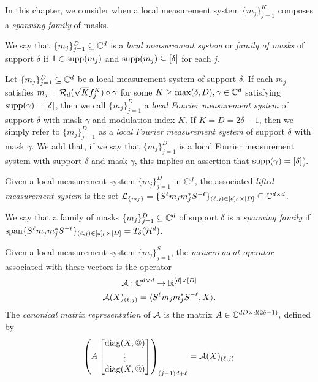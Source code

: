 In this chapter, we consider when a local measurement system $\{m_j\}_{j = 1}^K$ composes a \emph{spanning family} of masks.

\begin{definition}
  We say that $\{m_j\}_{j = 1}^D \subseteq \mathbb{C}^d$ is a \emph{local measurement system} or \emph{family of masks} of support $\delta$ if $1 \in \operatorname{supp}(m_j)$ and $\operatorname{supp}(m_j) \subseteq [\delta]$ for each $j$. \label{def:loc_meas}
\end{definition}

\begin{definition}
  Let $\{m_j\}_{j = 1}^D \subseteq \mathbb{C}^d$ be a local measurement system of support $\delta$.  If each $m_j$ satisfies $m_j = \mathcal{R}_d(\sqrt{K} f_j^K) \circ \gamma$ for some $K \ge \max(\delta, D), \gamma \in \mathbb{C}^d$ satisfying $\operatorname{supp}(\gamma) = [\delta]$, then we call $\{m_j\}_{j = 1}^D$ a \emph{local Fourier measurement system} of support $\delta$ with mask $\gamma$ and modulation index $K$.  If $K = D = 2 \delta - 1$, then we simply refer to $\{m_j\}_{j = 1}^D$ as a \emph{local Fourier measurement system} of support $\delta$ with mask $\gamma$.  We add that, if we say that $\{m_j\}_{j = 1}^D$ is a local Fourier measurement system with support $\delta$ and mask $\gamma$, this implies an assertion that $\operatorname{supp}(\gamma) = [\delta]$). \label{def:loc_four_meas}
\end{definition}

\begin{definition}
  Given a local measurement system $\{m_j\}_{j = 1}^D$ in $\mathbb{C}^d$, the associated \emph{lifted measurement system} is the set $\mathcal{L}_{\{m_j\}} = \{S^{\ell} m_j m_j^* S^{- \ell}\}_{(\ell, j) \in [d]_0 \times [D]} \subseteq \mathbb{C}^{d \times d}$. \label{def:lifted_meas}
\end{definition}

\begin{definition}
  We say that a family of masks $\{m_j\}_{j = 1}^D \subseteq \mathbb{C}^d$ of support $\delta$ is a \emph{spanning family} if $\operatorname{span} \{S^\ell m_j m_j^* S^{-\ell}\}_{(\ell, j) \in [d]_0 \times [D]} = T_\delta(\mathcal{H}^d)$. \label{def:span_fam}
\end{definition}

\begin{definition}
  Given a local measurement system $\{m_j\}_{j = 1}^S$, the \emph{measurement operator} associated with these vectors is the operator
  \begin{gather}
    \mathcal{A} : \mathbb{C}^{d \times d} \to \mathbb{R}^{[d] \times [D]} \nonumber \\
    \mathcal{A}(X)_{(\ell, j)} = \langle S^{\ell} m_j m_j^* S^{-\ell}, X \rangle. \label{eq:meas_op}
  \end{gather}
  The \emph{canonical matrix representation} of $\mathcal{A}$ is the matrix $A \in \mathbb{C}^{d D \times d (2 \delta - 1)},$ defined by
  \begin{equation}
    \left(A \colmatfun{\diag(X, @)}{1 - \delta}{\delta - 1}\right)_{(j - 1) d + \ell} = \Ac(X)_{(\ell, j)}
    \label{eq:meas_mat}
  \end{equation}
\end{definition}



